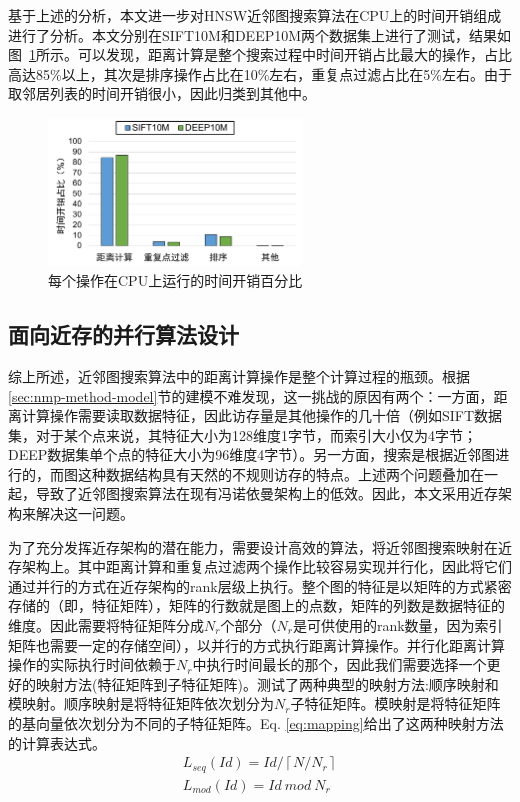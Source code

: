 基于上述的分析，本文进一步对HNSW近邻图搜索算法在CPU上的时间开销组成进行了分析。本文分别在SIFT10M和DEEP10M两个数据集上进行了测试，结果如图~\ref{fig:operation-time}所示。可以发现，距离计算是整个搜索过程中时间开销占比最大的操作，占比高达85\%以上，其次是排序操作占比在10\%左右，重复点过滤占比在5\%左右。由于取邻居列表的时间开销很小，因此归类到其他中。

\begin{figure}
  \centering
  \includegraphics[width=0.6\textwidth]{figures/context-2/operation-time.pdf}
  \caption{每个操作在CPU上运行的时间开销百分比}
  \label{fig:operation-time}
\end{figure}


\subsection{面向近存的并行算法设计}\label{sec:nmp-method-distance}
综上所述，近邻图搜索算法中的距离计算操作是整个计算过程的瓶颈。根据\ref{sec:nmp-method-model}节的建模不难发现，这一挑战的原因有两个：一方面，距离计算操作需要读取数据特征，因此访存量是其他操作的几十倍（例如SIFT数据集，对于某个点来说，其特征大小为128维度\times1字节，而索引大小仅为4字节；DEEP数据集单个点的特征大小为96维度\times4字节）。另一方面，搜索是根据近邻图进行的，而图这种数据结构具有天然的不规则访存的特点。上述两个问题叠加在一起，导致了近邻图搜索算法在现有冯诺依曼架构上的低效。因此，本文采用近存架构来解决这一问题。

为了充分发挥近存架构的潜在能力，需要设计高效的算法，将近邻图搜索映射在近存架构上。其中距离计算和重复点过滤两个操作比较容易实现并行化，因此将它们通过并行的方式在近存架构的rank层级上执行。整个图的特征是以矩阵的方式紧密存储的（即，特征矩阵），矩阵的行数就是图上的点数，矩阵的列数是数据特征的维度。因此需要将特征矩阵分成$N_r$个部分（$N_r$是可供使用的rank数量，因为索引矩阵也需要一定的存储空间），以并行的方式执行距离计算操作。并行化距离计算操作的实际执行时间依赖于$N_r$中执行时间最长的那个，因此我们需要选择一个更好的映射方法(特征矩阵到子特征矩阵)。测试了两种典型的映射方法:顺序映射和模映射。顺序映射是将特征矩阵依次划分为$N_r$子特征矩阵。模映射是将特征矩阵的基向量依次划分为不同的子特征矩阵。Eq. \ref{eq:mapping}给出了这两种映射方法的计算表达式。
\begin{equation}\label{eq:mapping}
\begin{split}
L_{seq}\left(Id\right) = Id / \left \lceil N / N_r \right \rceil \\
L_{mod}\left(Id\right) = Id\ mod\ N_r
\end{split}
\end{equation}

